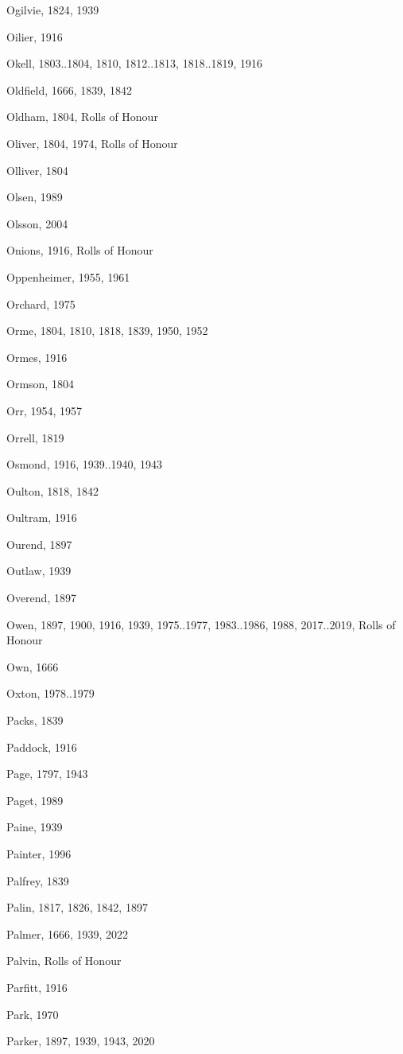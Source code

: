 \begin{theindex}
\item Ogilvie, 1824, 1939
\item Oilier, 1916
\item Okell, 1803..1804, 1810, 1812..1813, 1818..1819, 1916
\item Oldfield, 1666, 1839, 1842
\item Oldham, 1804, Rolls of Honour
\item Oliver, 1804, 1974, Rolls of Honour
\item Olliver, 1804
\item Olsen, 1989
\item Olsson, 2004
\item Onions, 1916, Rolls of Honour
\item Oppenheimer, 1955, 1961
\item Orchard, 1975
\item Orme, 1804, 1810, 1818, 1839, 1950, 1952
\item Ormes, 1916
\item Ormson, 1804
\item Orr, 1954, 1957
\item Orrell, 1819
\item Osmond, 1916, 1939..1940, 1943
\item Oulton, 1818, 1842
\item Oultram, 1916
\item Ourend, 1897
\item Outlaw, 1939
\item Overend, 1897
\item Owen, 1897, 1900, 1916, 1939, 1975..1977, 1983..1986, 1988, 2017..2019, Rolls of Honour
\item Own, 1666
\item Oxton, 1978..1979
\item Packs, 1839
\item Paddock, 1916
\item Page, 1797, 1943
\item Paget, 1989
\item Paine, 1939
\item Painter, 1996
\item Palfrey, 1839
\item Palin, 1817, 1826, 1842, 1897
\item Palmer, 1666, 1939, 2022
\item Palvin, Rolls of Honour
\item Parfitt, 1916
\item Park, 1970
\item Parker, 1897, 1939, 1943, 2020

\end{theindex}
